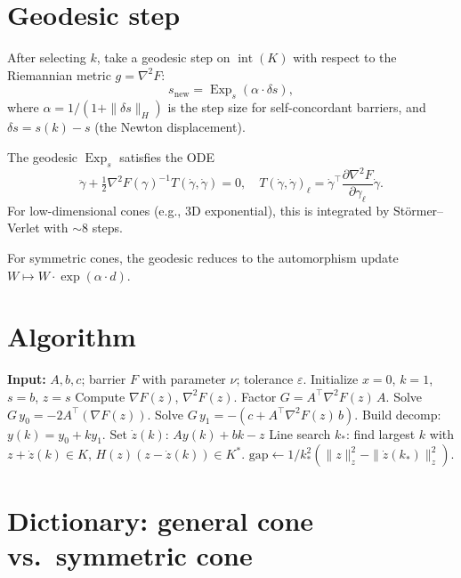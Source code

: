\documentclass[11pt]{article}
\newcommand{\norm}[1]{\|#1\|}
\newcommand{\half}{\tfrac{1}{2}}
\DeclareMathOperator{\Exp}{Exp}
\begin{document}
\section{Geodesic step}

After selecting $k$, take a geodesic step on $\operatorname{int}(K)$ with
respect to the Riemannian metric $g = \nabla^2 F$:
\[
  s_{\text{new}} = \Exp_s(\alpha \cdot \delta s),
\]
where $\alpha = 1/(1 + \norm{\delta s}_H)$ is the step size for self-concordant
barriers, and $\delta s = s(k) - s$ (the Newton displacement).

The geodesic $\Exp_s$ satisfies the ODE
\[
  \ddot\gamma + \half \nabla^2 F(\gamma)^{-1} T(\dot\gamma, \dot\gamma) = 0,
  \quad T(\dot\gamma, \dot\gamma)_\ell = \dot\gamma^\top \frac{\partial \nabla^2 F}{\partial \gamma_\ell} \dot\gamma.
\]
For low-dimensional cones (e.g., 3D exponential), this is integrated by
St\"ormer--Verlet with $\sim$8 steps.

For symmetric cones, the geodesic reduces to the automorphism update
$W \mapsto W \cdot \exp(\alpha \cdot d)$.

\section{Algorithm}

\begin{algorithm}[H]
\caption{Geodesic LP for cones with log-homogeneous barriers}
\begin{algorithmic}[1]
\State \textbf{Input:} $A, b, c$; barrier $F$ with parameter $\nu$; tolerance $\varepsilon$.
\State Initialize $x = 0$, $k = 1$, $s = b$, $z=s$
\Repeat
  \State Compute $\nabla F(z)$, $\nabla^2 F(z)$.
  \State Factor $G = A^\top \nabla^2 F(z) \, A$.
  \State Solve $G \, y_0 = -2 A^\top(\nabla F(z))$.
  \State Solve $G \, y_1 = -(c + A^\top \nabla^2 F(z) \, b)$.
  \State Build decomp: $y(k) = y_0 + k y_1$.
  \State Set $\dot z(k)$: $Ay(k) + b k - z$ 
  \State Line search $k_*$: find largest $k$ with
    $z+\dot z(k) \in K$, $ H(z)(z-\dot z(k))  \in K^*$.
  \State $\text{gap} \gets 1/k_*^2 (\|z\|^2_z - \|\dot z(k_*)\|^2_z)$.
\end{algorithmic}
\end{algorithm}

\section{Dictionary: general cone vs.\ symmetric cone}
\end{document}
